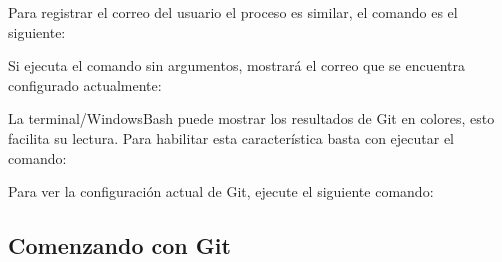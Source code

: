 Para registrar el correo del usuario el proceso es similar, el comando
es el siguiente:

\begin{Shaded}
\begin{Highlighting}[]
    \ExtensionTok{$}
\end{Highlighting}
\end{Shaded}

Si ejecuta el comando sin argumentos, mostrará el correo que se
encuentra configurado actualmente:

\begin{Shaded}
\begin{Highlighting}[]
    \ExtensionTok{$}
\end{Highlighting}
\end{Shaded}

La terminal/WindowsBash puede mostrar los resultados de Git en colores,
esto facilita su lectura. Para habilitar esta característica basta con
ejecutar el comando:

\begin{Shaded}
\begin{Highlighting}[]
    \ExtensionTok{$}
\end{Highlighting}
\end{Shaded}

Para ver la configuración actual de Git, ejecute el siguiente comando:

\begin{Shaded}
\begin{Highlighting}[]
    \ExtensionTok{$} 
\end{Highlighting}
\end{Shaded}

\begin{Shaded}
\begin{Highlighting}[]
    \ExtensionTok{$}
\end{Highlighting}
\end{Shaded}

\subsection{Comenzando con Git}

